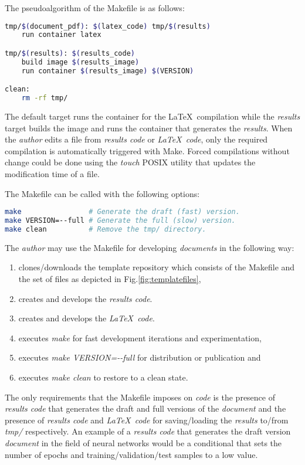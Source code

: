 \documentclass[journal]{IEEEtran}
\begin{document}
The pseudoalgorithm of the Makefile is as follows:
\begin{lstlisting}[language=bash, style=lststyle, caption={Pseudoalgorithm of the Makefile.}]
tmp/$(document_pdf): $(latex_code) tmp/$(results)
	run container latex

tmp/$(results): $(results_code)
	build image $(results_image)
	run container $(results_image) $(VERSION)

clean:
	rm -rf tmp/
\end{lstlisting}

The default target runs the container for the \LaTeX\ compilation while the \textit{results} target builds the image and runs the container that generates the \textit{results}.
When the \textit{author} edits a file from \textit{results code} or \textit{\LaTeX\ code}, only the required compilation is automatically triggered with Make.
Forced compilations without change could be done using the \textit{touch} POSIX utility that updates the modification time of a file.

The Makefile can be called with the following options:
\begin{lstlisting}[language=bash, style=lststyle, caption={Makefile options.}]
make                # Generate the draft (fast) version.
make VERSION=--full # Generate the full (slow) version.
make clean          # Remove the tmp/ directory.
\end{lstlisting}

The \textit{author} may use the Makefile for developing \textit{documents} in the following way:
\begin{enumerate}
	\item clones/downloads the template repository which consists of the Makefile and the set of files as depicted in Fig.\ref{fig:templatefiles},
	\item creates and develops the \textit{results code}.
	\item creates and develops the \textit{\LaTeX\ code}.
	\item executes \textit{make} for fast development iterations and experimentation,
	\item executes \textit{make VERSION=-{}-full} for distribution or publication and
	\item executes \textit{make clean} to restore to a clean state.
\end{enumerate}

The only requirements that the Makefile imposes on \textit{code} is the presence of \textit{results code} that generates the draft and full versions of the \textit{document} and the presence of \textit{results code} and \textit{\LaTeX\ code} for saving/loading the \textit{results} to/from \textit{tmp/} respectively.
An example of a \textit{results code} that generates the draft version \textit{document} in the field of neural networks would be a conditional that sets the number of epochs and training/validation/test samples to a low value.
\end{document}
